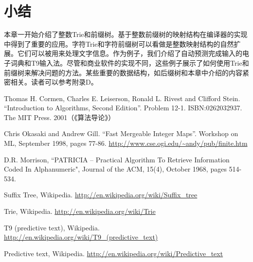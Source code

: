 \documentclass[b5paper]{ctexart}
\begin{document}
\section{小结}

本章一开始介绍了整数Trie和前缀树。基于整数前缀树的映射结构在编译器的实现中得到了重要的应用。字符Trie和字符前缀树可以看做是整数映射结构的自然扩展。它们可以被用来处理文字信息。作为例子，我们介绍了自动预测完成输入的电子词典和T9输入法。尽管和商业软件的实现不同，这些例子展示了如何使用Trie和前缀树来解决问题的方法。某些重要的数据结构，如后缀树和本章中介绍的内容紧密相关。读者可以参考附录D。

\ifx\wholebook\relax\else
\begin{thebibliography}{99}

Thomas H. Cormen, Charles E. Leiserson, Ronald L. Rivest and Clifford Stein.
``Introduction to Algorithms, Second Edition''. Problem 12-1. ISBN:0262032937. The MIT Press. 2001（《算法导论》）

Chris Okasaki and Andrew Gill. ``Fast Mergeable Integer Maps''. Workshop on ML, September 1998, pages 77-86.  \url{http://www.cse.ogi.edu/~andy/pub/finite.htm}

D.R. Morrison, ``PATRICIA -- Practical Algorithm To Retrieve  Information Coded In Alphanumeric", Journal of the ACM, 15(4), October 1968, pages 514-534.

Suffix Tree, Wikipedia. \url{http://en.wikipedia.org/wiki/Suffix_tree}

Trie, Wikipedia. \url{http://en.wikipedia.org/wiki/Trie}

T9 (predictive text), Wikipedia. \url{http://en.wikipedia.org/wiki/T9_(predictive_text)}

Predictive text,
Wikipedia. \url{http://en.wikipedia.org/wiki/Predictive_text}

\end{thebibliography}
\end{document}
